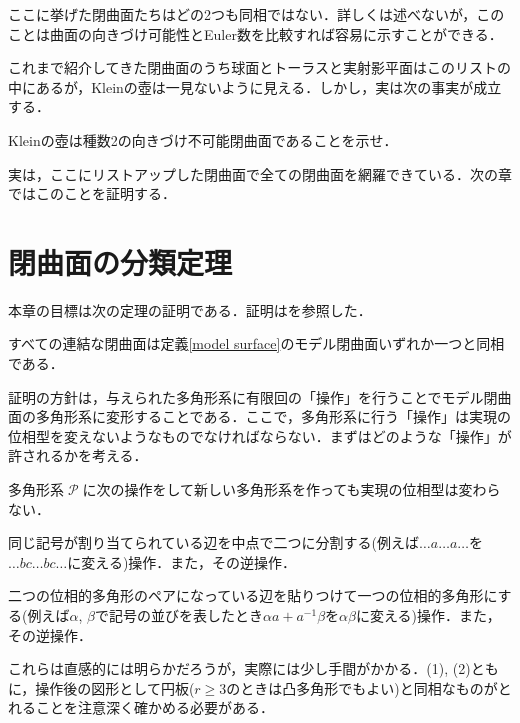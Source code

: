 \documentclass[dvipdfmx,uplatex]{jsarticle}
\begin{document}
ここに挙げた閉曲面たちはどの2つも同相ではない．詳しくは述べないが，このことは曲面の向きづけ可能性とEuler数を比較すれば容易に示すことができる．

これまで紹介してきた閉曲面のうち球面とトーラスと実射影平面はこのリストの中にあるが，Kleinの壺は一見ないように見える．しかし，実は次の事実が成立する．

\begin{problem}
Kleinの壺は種数2の向きづけ不可能閉曲面であることを示せ．
\end{problem}

実は，ここにリストアップした閉曲面で全ての閉曲面を網羅できている．次の章ではこのことを証明する．

\section{閉曲面の分類定理}

本章の目標は次の定理の証明である．証明は\cite{Seifert}を参照した．

\begin{theorem}[閉曲面の分類定理]\label{classification}
すべての連結な閉曲面は定義\ref{model surface}のモデル閉曲面いずれか一つと同相である．
\end{theorem}

証明の方針は，与えられた多角形系に有限回の「操作」を行うことでモデル閉曲面の多角形系に変形することである．ここで，多角形系に行う「操作」は実現の位相型を変えないようなものでなければならない．まずはどのような「操作」が許されるかを考える．

\begin{lemma}\label{transformation}
多角形系$\mscrP$に次の操作をして新しい多角形系を作っても実現の位相型は変わらない．
\begin{enumarabicp}
\item 同じ記号が割り当てられている辺を中点で二つに分割する(例えば$\dots a \dots a \dots$を$\dots bc \dots bc \dots$に変える)操作．また，その逆操作．
\item 二つの位相的多角形のペアになっている辺を貼りつけて一つの位相的多角形にする(例えば$\alpha$, $\beta$で記号の並びを表したとき$\alpha a+a^{-1}\beta$を$\alpha\beta$に変える)操作．また，その逆操作．
\end{enumarabicp}
\end{lemma}

これらは直感的には明らかだろうが，実際には少し手間がかかる．(1), (2)ともに，操作後の図形として円板($r\geq 3$のときは凸多角形でもよい)と同相なものがとれることを注意深く確かめる必要がある．
\end{document}
